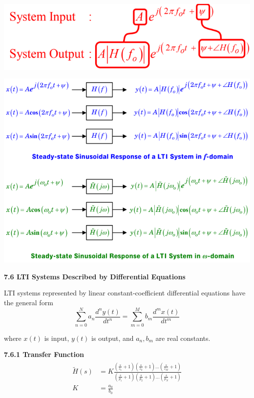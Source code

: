 \documentclass[landscape,a4paper]{extarticle}
\newenvironment{Figure}
  {\noindent\minipage{\linewidth}}
  {\endminipage\par\medskip}
\begin{document}
\begin{multicols*}{5}
    \begin{Figure}
        \includegraphics[width=0.8\linewidth]{sinusoidalResponseComparison.png}        
    \end{Figure}

    \begin{Figure}
        \includegraphics[width=\linewidth]{sinusoidalResponse.png}        
    \end{Figure}

    \textbf{7.6 LTI Systems Described by Differential Equations}

    LTI systems represented by linear constant-coefficient differential equations have the general form
    \[
        \sum_{n=0}^{N}a_n \frac{d^ny(t)}{dt^n} = \sum_{m=0}^{M} b_m \frac{d^mx(t)}{dt^m} \tag{7.21}
    \]

    where $x(t)$ is input, $y(t)$ is output, and $a_n, b_m$ are real constants.

    \textbf{7.6.1 Transfer Function}
    \begin{align*}
        \begin{split}
            \tilde{H}(s) &= K\frac{\left(\frac{s}{z_1} + 1\right)\left(\frac{s}{z_2} + 1\right) \ldots \left(\frac{s}{z_M} + 1\right)}{\left(\frac{s}{p_1} + 1\right)\left(\frac{s}{p_2} + 1\right) \ldots \left(\frac{s}{p_N} + 1\right)}\\
            K &= \frac{a_0}{b_0}
        \end{split} \tag{7.23b}
    \end{align*}


\end{multicols*}
\end{document}
